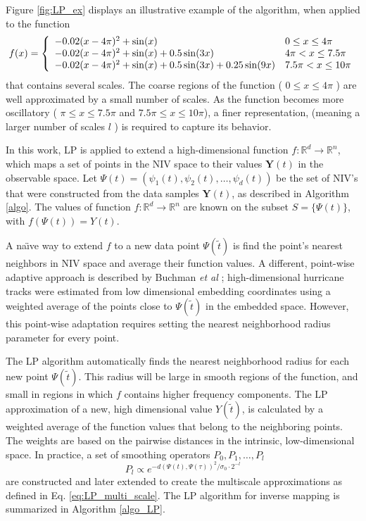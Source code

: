 \documentclass[aip,jcp,reprint,twocolumn]{revtex4-1}
\begin{document}
\begin{widetext}
Figure \ref{fig:LP_ex} displays an illustrative example of the algorithm, when applied to the function 
 \begin{equation} \label{eq:LP_example}
f(x) = \left\{
\begin{array}{l l}
-0.02(x-4\pi)^2 + \sin(x) &  0 \le x \le 4\pi \\
-0.02(x-4\pi)^2 + \sin(x) + 0.5 \sin(3x) &  4\pi < x \le 7.5 \pi \\
-0.02(x-4\pi)^2 + \sin(x) + 0.5 \sin(3x) +0.25 \sin(9x) &  7.5 \pi < x \le 10 \pi
\end{array}
\right.
\end{equation}
that contains several scales. 
%
The coarse regions of the function ( $0 \le x \le 4\pi$ ) are well approximated by a small number of scales. 
%
As the function becomes more oscillatory ( $\pi \le x \le 7.5\pi$ and $7.5\pi \le x \le 10\pi$), 
a finer representation, (meaning a larger number of scales  $l$ )  is required to capture its behavior.
\end{widetext}

In this work, LP is applied to extend a high-dimensional function $f:\mathbb{R}^d \rightarrow \mathbb{R}^n$, which maps a set of points in the NIV space to their values $\mathbf{Y}(t)$ in the observable space.
%
Let $\Psi(t) = \left(\psi_1(t),\psi_2(t),\ldots,\psi_d(t)\right)$ be the set of NIV's that were constructed from the data samples $\mathbf{Y}(t)$, as described in Algorithm \ref{algo}. 
%
The values of function $f:\mathbb{R}^d \rightarrow \mathbb{R}^n$ are known on the subset $S = \{\Psi(t)\}$, with $f(\Psi(t)) = Y(t)$.

A na\"{\i}ve way to extend $f$ to a new data point $\Psi(\tilde{t})$ is find the point's nearest neighbors in NIV space and average their function values. 
%
A different, point-wise adaptive approach is described by Buchman {\em et al} \cite{buchman2011high}; 
high-dimensional hurricane tracks were estimated from low dimensional embedding coordinates using a weighted average of the points close to $\Psi(\tilde{t})$ in the embedded space. 
%
However, this point-wise adaptation requires setting the nearest neighborhood radius parameter for every point.

The LP algorithm automatically finds the nearest neighborhood radius for each new point $\Psi(\tilde{t})$. 
%
This radius will be large in smooth regions of the function, and small in regions in which $f$ contains higher frequency components. 
%
The LP approximation of a new, high dimensional value $Y(\tilde{t})$, is calculated by a weighted average of the function values that belong to the neighboring points. 
%
The weights are based on the pairwise distances in the intrinsic, low-dimensional space. 
%
In practice, a set of smoothing operators $P_0, P_1, \ldots, P_l$
\begin{equation} \label{eq:LP_multi_scale_app}
P_l \propto e^{-d(\Psi(t),\Psi(\tau))^2 / \sigma_0 \cdot 2^{-l}}
\end{equation}
are constructed and later extended to create the multiscale approximations as defined in Eq. \ref{eq:LP_multi_scale}.
%
The LP algorithm for inverse mapping is summarized in Algorithm \ref{algo_LP}.
\end{document}
